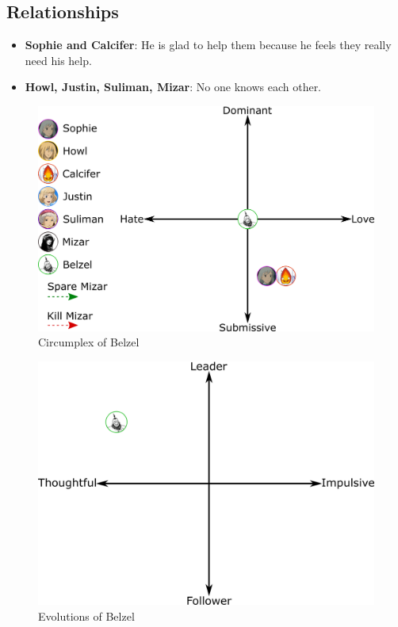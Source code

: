 \subsection{Relationships}
\begin{itemize}
\item \textbf{Sophie and Calcifer}: He is glad to help them because he feels they really need his help.
\item \textbf{Howl, Justin, Suliman, Mizar}: No one knows each other.
\end{itemize}

\begin{figure}[H]
  \centering
  \includegraphics[width=14cm]{Images/Diagrams/Circumplexes/belzelCircumplex}
  \caption{Circumplex of Belzel}
\end{figure}

\begin{figure}[H]
   \centering
   \includegraphics[width=14cm]{Images/Diagrams/Evolutions/belzelEvolution}
   \caption{Evolutions of Belzel}
\end{figure}

